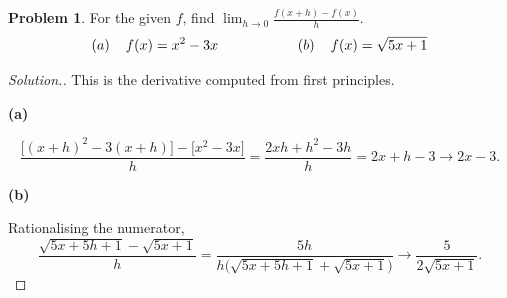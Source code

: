 \documentclass[11pt,a4paper]{article}
\theoremstyle{definition}
\newtheorem{problemx}{Problem}[subsection]
\newenvironment{problem}{\begin{problemx}}{\end{problemx}}
\newenvironment{solution}
  {\renewcommand{\qedsymbol}{}\begin{proof}[\textit{Solution}.]}
  {\end{proof}}
\newcommand{\subhead}[1]{%
  \par\medskip\noindent\textbf{#1}\par\nobreak\smallskip}
\begin{document}
\begin{problem}
For the given $f$, find
$\displaystyle{\lim_{h\rightarrow 0}\frac{f(x+h)-f(x)}{h}}$.
$$(a)\hspace{0.4cm} f(x) = x^2-3x \hspace{2cm} (b)\hspace{0.4cm} f(x) = \sqrt{5x+1}$$
\end{problem}
\begin{solution}
This is the derivative computed from first principles.

\subhead{(a)}
$$\frac{\big[(x+h)^2 - 3(x+h)\big] - \big[x^2-3x\big]}{h}
= \frac{2xh + h^2 - 3h}{h} = 2x + h - 3 \longrightarrow 2x-3 .$$

\subhead{(b)}
Rationalising the numerator,
$$\frac{\sqrt{5x+5h+1}-\sqrt{5x+1}}{h}
= \frac{5h}{h\big(\sqrt{5x+5h+1}+\sqrt{5x+1}\big)}
\longrightarrow \frac{5}{2\sqrt{5x+1}} .$$
\end{solution}
\end{document}
